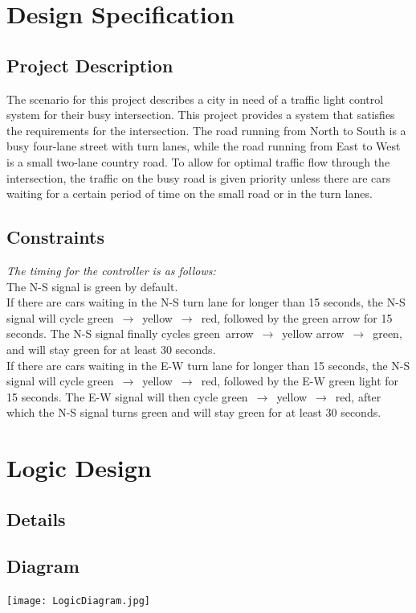 \section{Design Specification}
\subsection{Project Description}
The scenario for this project describes a city in need of a traffic light control system for their busy intersection.
This project provides a system that satisfies the requirements for the intersection. The road running from North to South is a busy four-lane street with turn lanes,
while the road running from East to West is a small two-lane country road. To allow for optimal traffic flow through the intersection,
the traffic on the busy road is given priority unless there are cars waiting for a certain period of time on the small road or in the turn lanes.

\subsection{Constraints}
\emph{The timing for the controller is as follows:}\\[5mm]
The N-S signal is green by default.\\[5mm]
If there are cars waiting in the N-S turn lane for longer than 15 seconds, the N-S signal will cycle green~$\rightarrow$~yellow~$\rightarrow$~red, followed by the green arrow for 15 seconds.
The N-S signal finally cycles green~arrow~$\rightarrow$~yellow arrow~$\rightarrow$~green, and will stay green for at least 30 seconds.\\[5mm]
If there are cars waiting in the E-W turn lane for longer than 15 seconds, the N-S signal will cycle green~$\rightarrow$~yellow~$\rightarrow$~red, followed by the E-W green light for 15 seconds.
The E-W signal will then cycle green~$\rightarrow$~yellow~$\rightarrow$~red, after which the N-S signal turns green and will stay green for at least 30 seconds.

\section{Logic Design}
\subsection{Details}
\subsection{Diagram}
\texttt{[image: LogicDiagram.jpg]}
\newpage
